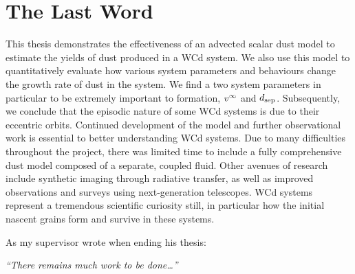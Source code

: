\section{The Last Word}

This thesis demonstrates the effectiveness of an advected scalar dust model to estimate the yields of dust produced in a WCd system.
We also use this model to quantitatively evaluate how various system parameters and behaviours change the growth rate of dust in the system.
We find a two system parameters in particular to be extremely important to formation, $v^\infty$ and $d_\text{sep}$.
Subsequently, we conclude that the episodic nature of some WCd systems is due to their eccentric orbits.
Continued development of the model and further observational work is essential to better understanding WCd systems.
Due to many difficulties throughout the project, there was limited time to include a fully comprehensive dust model composed of a separate, coupled fluid.
Other avenues of research include synthetic imaging through radiative transfer, as well as improved observations and surveys using next-generation telescopes.
WCd systems represent a tremendous scientific curiosity still, in particular how the initial nascent grains form and survive in these systems.

As my supervisor wrote when ending his thesis:

\begin{center}
  \emph{``There remains much work to be done\ldots''}
\end{center}